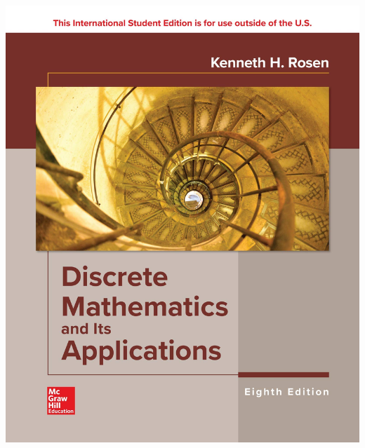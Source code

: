 \begin{frame}
\begin{columns}[t]
\begin{column}{0.45\textwidth}
\includegraphics[scale=.07]{./Figure/DMA.jpg}
    \end{column}
  \end{columns}
\end{frame}
%
%
